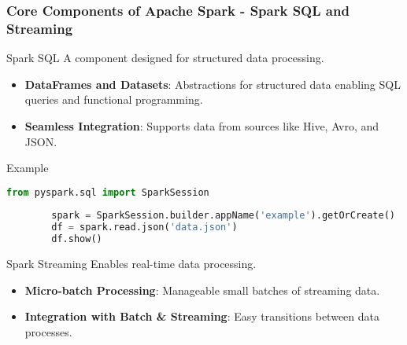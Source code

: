 \documentclass[aspectratio=169]{beamer}
\begin{document}
\begin{frame}[fragile]
    \frametitle{Core Components of Apache Spark - Spark SQL and Streaming}
    \begin{block}{Spark SQL}
        A component designed for structured data processing.
    \end{block}
    \begin{itemize}
        \item \textbf{DataFrames and Datasets}: Abstractions for structured data enabling SQL queries and functional programming.
        \item \textbf{Seamless Integration}: Supports data from sources like Hive, Avro, and JSON.
    \end{itemize}
    \begin{block}{Example}
        \begin{lstlisting}[language=Python]
        from pyspark.sql import SparkSession
        
        spark = SparkSession.builder.appName('example').getOrCreate()
        df = spark.read.json('data.json')
        df.show()
        \end{lstlisting}
    \end{block}

    \begin{block}{Spark Streaming}
        Enables real-time data processing.
    \end{block}
    \begin{itemize}
        \item \textbf{Micro-batch Processing}: Manageable small batches of streaming data.
        \item \textbf{Integration with Batch & Streaming}: Easy transitions between data processes.
    \end{itemize}
\end{frame}
\end{document}
